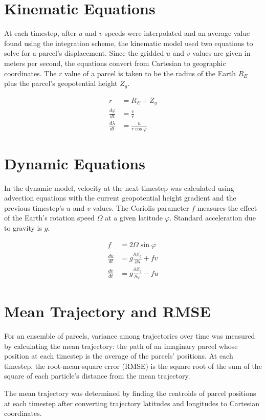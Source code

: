 \section{Kinematic Equations}
At each timestep, after $u$ and $v$ speeds were interpolated and an average value found using the integration scheme, the kinematic model used two equations to solve for a parcel's displacement. 
Since the gridded $u$ and $v$ values are given in meters per second, the equations convert from Cartesian to geographic coordinates. 
The $r$ value of a parcel is taken to be the radius of the Earth $R_E$ plus the parcel's geopotential height $Z_g$.

\begin{align}
r &= R_E + Z_g \\
\frac{d \varphi}{dt} &= \frac{v}{r} \\
\frac{d \lambda}{dt} &= \frac{u}{r \cos{\varphi}}
\end{align}

\section{Dynamic Equations}
In the dynamic model, velocity at the next timestep was calculated using advection equations with the current geopotential height gradient and the previous timestep's $u$ and $v$ values.
The Coriolis parameter $f$ measures the effect of the Earth's rotation speed $\Omega$ at a given latitude $\varphi$.
Standard acceleration due to gravity is $g$. 

\begin{align}
f &= 2 \Omega \sin{\varphi} \\
\frac{du}{dt} &= g \frac{\partial Z_g}{\partial \lambda} + fv \\
\frac{dv}{dt} &= g \frac{\partial Z_g}{\partial \varphi} - fu
\end{align}

\section{Mean Trajectory and RMSE}
For an ensemble of parcels, variance among trajectories over time was measured by calculating the mean trajectory: the path of an imaginary parcel whose position at each timestep is the average of the parcels' positions.
At each timestep, the root-mean-square error (RMSE) is the square root of the sum of the square of each particle's distance from the mean trajectory.

The mean trajectory was determined by finding the centroids of parcel positions at each timestep after converting trajectory latitudes and longitudes to Cartesian coordinates.

